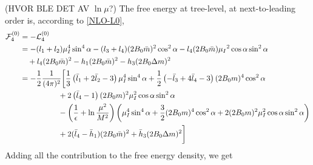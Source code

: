 (HVOR BLE DET AV $\ln \mu$?)
The free energy at tree-level, at next-to-leading order is, according to \cref{NLO-L0}, 
\begin{align*}
    \mathcal{F}^{(0)}_4
    & 
    = - \mathcal{L}_4^{(0)} 
    \\
    & = 
    - (l_1 + l_2)\mu_I^4 \sin^4{\alpha}
    - (l_3 + l_4)(2 B_0 \bar m)^2 \cos^2{\alpha}
    - l_4 (2 B_0 \bar m ) \mu_I{}^2 \cos{\alpha} \sin^2{\alpha}
    \\
    & 
    \quad + l_4 (2B_0 \bar m )^2
    - h_1 (2B_0 \bar m)^2
    - h_3 (2B_0 \Delta m)^2
    \\
    & = 
    - \frac{1}{2} \frac{1}{(4 \pi)^2}
    \bigg[
        \frac{1}{3}
        \left( 
            \bar l_1 + 2 \bar l_2 - 3
        \right) \mu_I^4 \sin^4 \alpha
        +
        \frac{1}{2}
        \left(
            - \bar l_3 + 4 \bar l_4 - 3
        \right) (2 B_0 m)^4 \cos^2\alpha
        \\
        & \quad \quad \quad \quad \quad
        + 2 \left(\bar l_4 - 1\right)
        (2 B_0 m)^2 \mu_I^2 \cos\alpha \sin^2 \alpha
        \\
        & \quad \quad \quad \quad \quad
        - 
        \left(\frac{1}{\epsilon} + \ln \frac{\mu^2}{M^2}\right) 
        \left(
            \mu_I^4\sin^4\alpha + \frac{3}{2} (2 B_0 m)^4 \cos^2 \alpha
            + 2 (2 B_0 m)^2 \mu_I^2 \cos\alpha \sin^2 \alpha
        \right) 
        \\
        & \quad \quad \quad \quad \quad
        + 2 (\bar l_4 - \bar h_1) (2B_0 \bar m )^2
        + \bar h_3 (2B_0 \Delta m)^2
    \bigg] 
\end{align*}
Adding all the contribution to the free energy density, we get
